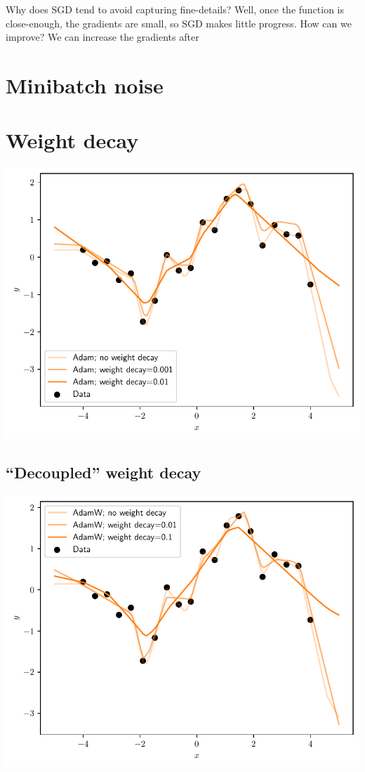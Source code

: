 \documentclass{article}
\newcommand{\0}{\mathbf{0}}
\begin{document}
Why does SGD tend to avoid capturing fine-details?  Well, once the function is close-enough, the gradients are small, so SGD makes little progress.
How can we improve?  We can increase the gradients after 

\newpage
\section{Minibatch noise}

\newpage
\section{Weight decay}
\includegraphics[width=\textwidth]{weight_decay.pdf}

\newpage
\subsection{``Decoupled'' weight decay}
\includegraphics[width=\textwidth]{decoupled_weight_decay.pdf}
\end{document}
